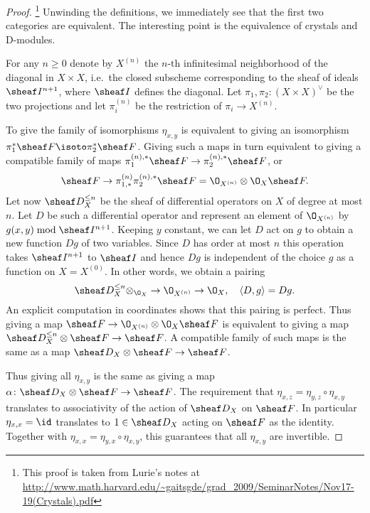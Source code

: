 \documentclass{ck-article}
\begin{document}
\begin{proof}\footnote{This proof is taken from Lurie's notes at \url{http://www.math.harvard.edu/~gaitsgde/grad_2009/SeminarNotes/Nov17-19(Crystals).pdf}}
    Unwinding the definitions, we immediately see that the first two categories are equivalent.
    The interesting point is the equivalence of crystals and D-modules.

    For any $n \ge 0$ denote by $X^{(n)}$ the $n$-th infinitesimal  neighborhood of the diagonal in $X \times X$, i.e.~the closed subscheme corresponding to the sheaf of ideals $\sheaf I^{n+1}$, where $\sheaf I$ defines the diagonal.
    Let $\pi_1, \pi_2 \colon (X \times X)^\vee$ be the two projections and let $\pi_i^{(n)}$ be the restriction of $\pi_i \to X^{(n)}$.

    To give the family of isomorphisms $\eta_{x,y}$ is equivalent to giving an isomorphism $\pi_1^*\sheaf F \isoto \pi_2^*\sheaf F$.
    Giving such a maps in turn equivalent to giving a compatible family of maps $\pi_1^{(n),*}\sheaf F \to \pi_2^{(n),*}\sheaf F$, or
    \[
        \sheaf F \to \pi_{1,*}^{(n)}\pi_2^{(n),*}\sheaf F = \O_{X^{(n)}} \otimes \O_X \sheaf F.
    \]
    Let now $\sheaf D_X^{\le n}$ be the sheaf of differential operators on $X$ of degree at most $n$.
    Let $D$ be such a differential operator and represent an element of $\O_{X^{(n)}}$ by $g(x,y) \bmod \sheaf I^{n+1}$.
    Keeping $y$ constant, we can let $D$ act on $g$ to obtain a new function $Dg$ of two variables.
    Since $D$ has order at most $n$ this operation takes $\sheaf I^{n+1}$ to $\sheaf I$ and hence $Dg$ is independent of the choice $g$ as a function on $X = X^{(0)}$.
    In other words, we obtain a pairing
    \[
        \sheaf D_X^{\le n} \otimes_{\O_X} \to \O_{X^{(n)}} \to \O_X, \quad \langle D, g\rangle = Dg.
    \]
    An explicit computation in coordinates shows that this pairing is perfect.
    Thus giving a map $\sheaf F \to \O_{X^{(n)}} \otimes \O_X \sheaf F$ is equivalent to giving a map $\sheaf D_X^{\le n} \otimes \sheaf F \to \sheaf F$.
    A compatible family of such maps is the same as a map $\sheaf D_X \otimes \sheaf F \to \sheaf F$.

    Thus giving all $\eta_{x,y}$ is the same as giving a map $\alpha\colon\sheaf D_X \otimes \sheaf F \to \sheaf F$.
    The requirement that $\eta_{x,z} = \eta_{y,z} \circ \eta_{x,y}$ translates to associativity of the action of $\sheaf D_X$ on $\sheaf F$.
    In particular $\eta_{x,x} = \id$ translates to $1 \in \sheaf D_X$ acting on $\sheaf F$ as the identity.
    Together with $\eta_{x,x} = \eta_{y,x} \circ \eta_{x,y}$, this guarantees that all $\eta_{x,y}$ are invertible.
\end{proof}
\end{document}
